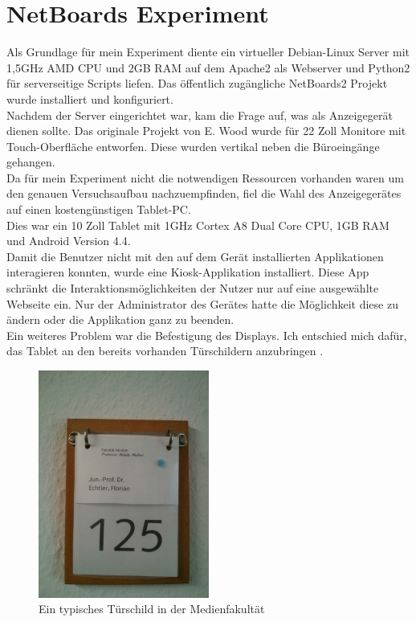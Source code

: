 \section{NetBoards Experiment}\label{NetBoards Experiment}
Als Grundlage für mein Experiment diente ein virtueller Debian-Linux Server mit 1,5GHz AMD CPU und 2GB RAM auf dem Apache2 als Webserver und Python2 für serverseitige Scripts liefen. Das öffentlich zugängliche NetBoards2 Projekt wurde installiert und konfiguriert.
\\
Nachdem der Server eingerichtet war, kam die Frage auf, was als Anzeigegerät dienen sollte. Das originale Projekt von E. Wood wurde für 22 Zoll Monitore mit Touch-Oberfläche entworfen. Diese wurden vertikal neben die Büroeingänge gehangen.
\\
Da für mein Experiment nicht die notwendigen Ressourcen vorhanden waren um den genauen Versuchsaufbau nachzuempfinden, fiel die Wahl des Anzeigegerätes auf einen kostengünstigen Tablet-PC.
\\
Dies war ein 10 Zoll Tablet mit 1GHz Cortex A8 Dual Core CPU, 1GB RAM und Android Version 4.4.
\\
Damit die Benutzer nicht mit den auf dem Gerät installierten Applikationen interagieren konnten, wurde eine Kiosk-Applikation installiert.
Diese App schränkt die Interaktionsmöglichkeiten der Nutzer nur auf eine ausgewählte Webseite ein. Nur der Administrator des Gerätes hatte die Möglichkeit diese zu ändern oder die Applikation ganz zu beenden.
\\
Ein weiteres Problem war die Befestigung des Displays.
Ich entschied mich dafür, das Tablet an den bereits vorhanden Türschildern anzubringen .
\begin{figure}[h!]
  \centering
    \includegraphics[width=0.5\textwidth]{./img/Tuerschild.jpg}
  \caption{Ein typisches Türschild in der Medienfakultät}
  \label{img:tuerschild}
\end{figure}\\
